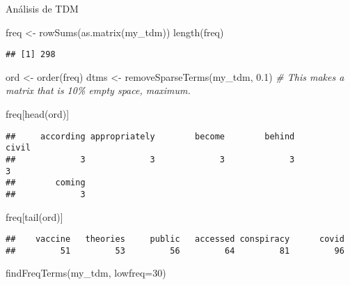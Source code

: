 \documentclass[
]{book}
\newenvironment{Shaded}{\begin{snugshade}}{\end{snugshade}}
\newcommand{\AttributeTok}[1]{\textcolor[rgb]{0.77,0.63,0.00}{#1}}
\newcommand{\CommentTok}[1]{\textcolor[rgb]{0.56,0.35,0.01}{\textit{#1}}}
\newcommand{\DecValTok}[1]{\textcolor[rgb]{0.00,0.00,0.81}{#1}}
\newcommand{\FloatTok}[1]{\textcolor[rgb]{0.00,0.00,0.81}{#1}}
\newcommand{\FunctionTok}[1]{\textcolor[rgb]{0.00,0.00,0.00}{#1}}
\newcommand{\NormalTok}[1]{#1}
\newcommand{\OtherTok}[1]{\textcolor[rgb]{0.56,0.35,0.01}{#1}}
\begin{document}
Análisis de TDM

\begin{Shaded}
\begin{Highlighting}[]
\NormalTok{freq }\OtherTok{\textless{}{-}} \FunctionTok{rowSums}\NormalTok{(}\FunctionTok{as.matrix}\NormalTok{(my\_tdm))}
\FunctionTok{length}\NormalTok{(freq)}
\end{Highlighting}
\end{Shaded}

\begin{verbatim}
## [1] 298
\end{verbatim}

\begin{Shaded}
\begin{Highlighting}[]
\NormalTok{ord }\OtherTok{\textless{}{-}} \FunctionTok{order}\NormalTok{(freq)}
\NormalTok{dtms }\OtherTok{\textless{}{-}} \FunctionTok{removeSparseTerms}\NormalTok{(my\_tdm, }\FloatTok{0.1}\NormalTok{) }
\CommentTok{\# This makes a matrix that is 10\% empty space, maximum.}

\NormalTok{freq[}\FunctionTok{head}\NormalTok{(ord)]}
\end{Highlighting}
\end{Shaded}

\begin{verbatim}
##     according appropriately        become        behind         civil 
##             3             3             3             3             3 
##        coming 
##             3
\end{verbatim}

\begin{Shaded}
\begin{Highlighting}[]
\NormalTok{freq[}\FunctionTok{tail}\NormalTok{(ord)]}
\end{Highlighting}
\end{Shaded}

\begin{verbatim}
##    vaccine   theories     public   accessed conspiracy      covid 
##         51         53         56         64         81         96
\end{verbatim}

\begin{Shaded}
\begin{Highlighting}[]
\FunctionTok{findFreqTerms}\NormalTok{(my\_tdm, }\AttributeTok{lowfreq=}\DecValTok{30}\NormalTok{)}
\end{Highlighting}
\end{Shaded}
\end{document}
